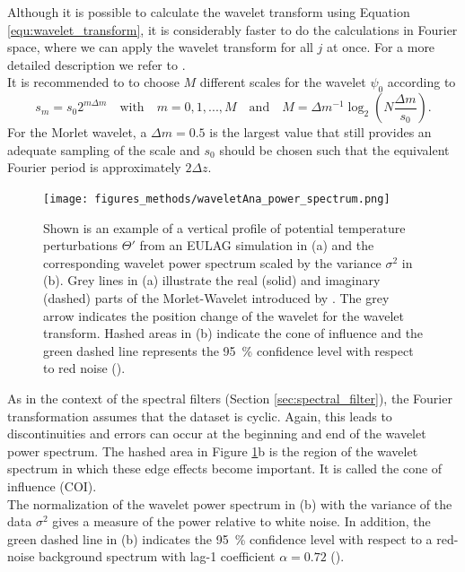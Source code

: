 Although it is possible to calculate the wavelet transform using Equation \ref{equ:wavelet_transform}, it is considerably faster to do the calculations in Fourier space, where we can apply the wavelet transform for all $j$ at once. For a more detailed description we refer to \textcite{torrence_practical_1998}.\\
It is recommended to to choose $M$ different scales for the wavelet $\psi_0$ according to 
\begin{equation}
    s_m = s_0 2^{m \Delta m} \quad \textrm{with} \quad m = 0,1,...,M \quad \textrm{and} \quad M = \Delta m^{-1} \log_2(N \frac{\Delta m}{s_0}).    
\end{equation}
For the Morlet wavelet, a $\Delta m=0.5$ is the largest value that still provides an adequate sampling of the scale and $s_0$ should be chosen such that the equivalent Fourier period is approximately $2 \Delta z$.

\begin{figure}[t]
    \centering
    \texttt{[image: figures\_methods/waveletAna\_power\_spectrum.png]}
    \caption{Shown is an example of a vertical profile of potential temperature perturbations $\Theta'$ from an EULAG simulation in (a) and the corresponding wavelet power spectrum scaled by the variance $\sigma^2$ in (b). Grey lines in (a) illustrate the real (solid) and imaginary (dashed) parts of the Morlet-Wavelet introduced by \textcite{torrence_practical_1998}. The grey arrow indicates the position change of the wavelet for the wavelet transform. Hashed areas in (b) indicate the cone of influence and the green dashed line represents the \SI{95}{\percent} confidence level with respect to red noise (\cite[]{torrence_practical_1998}).}
    \label{fig:wavelet_example}
\end{figure}
As in the context of the spectral filters (Section \ref{sec:spectral_filter}), the Fourier transformation assumes that the dataset is cyclic. Again, this leads to discontinuities and errors can occur at the beginning and end of the wavelet power spectrum. The hashed area in Figure \ref{fig:wavelet_example}b is the region of the wavelet spectrum in which these edge effects become important. It is called the cone of influence (COI).\\
The normalization of the wavelet power spectrum in (b) with the variance of the data $\sigma^2$ gives a measure of the power relative to white noise. In addition, the green dashed line in (b) indicates the \SI{95}{\percent} confidence level with respect to a red-noise background spectrum with lag-1 coefficient $\alpha=0.72$ (\cite{torrence_practical_1998}).

